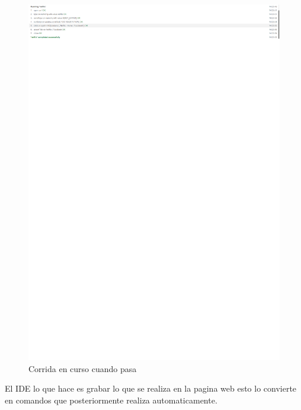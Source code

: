 \documentclass[conference]{IEEEtran}
\begin{document}
\begin{figure}[H]
\centering
\includegraphics[scale=1.4]{imagenes/17runningpass.pdf}
\caption{Corrida en curso cuando pasa}
\end{figure}

El IDE lo que hace es grabar lo que se realiza en la pagina web esto lo convierte en comandos que posteriormente realiza automaticamente.
\end{document}
